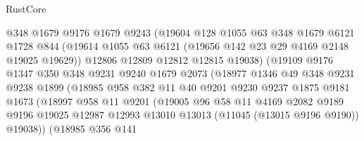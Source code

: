 \begin{lexlean}{RustCore}
\begin{coremodule}
                          @348
                          @1679
                          @9176
                          @1679
                          @9243
                          (@19604
                            @128
                            @1055
                            @63
                            @348
                            @1679
                            @6121
                            @1728
                            @844
                            (@19614 @1055 @63 @6121 (@19656 @142 @23 @29 @4169 @2148 @19025 @19629))
                            @12806
                            @12809
                            @12812
                            @12815
                            @19038)
                          (@19109
                            @9176
                            @1347
                            @350
                            @348
                            @9231
                            @9240
                            @1679
                            @2073
                            (@18977
                              @1346
                              @49
                              @348
                              @9231
                              @9238
                              @1899
                              (@18985
                                @958
                                @382
                                @11
                                @40
                                @9201
                                @9230
                                @9237
                                @1875
                                @9181
                                @1673
                                (@18997
                                  @958
                                  @11
                                  @9201
                                  (@19005
                                    @96
                                    @58
                                    @11
                                    @4169
                                    @2082
                                    @9189
                                    @9196
                                    @19025
                                    @12987
                                    @12993
                                    @13010
                                    @13013
                                    (@11045 (@13015 @9196 @9190))
                                    @19038))
                                (@18985
                                  @356
                                  @141

\end{coremodule}
\end{lexlean}
